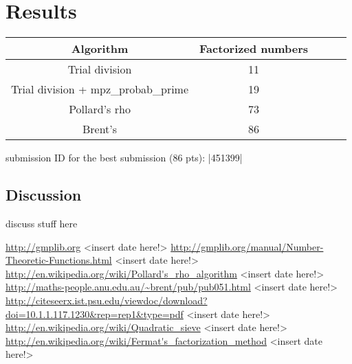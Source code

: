 \documentclass[paper=a4, fontsize=11pt,numbers=endperiod]{scrartcl} %
\numberwithin{equation}{section} %
\numberwithin{figure}{section} %
\numberwithin{table}{section} %
\begin{document}
\hspace{0pt}\\\\

\section{Results}


    \begin{tabular}{|c|c|c|c|c|}
    \hline
    \textbf{Algorithm} & \textbf{Factorized numbers} \\ \hline
    Trial division & 11 \\ \hline
    Trial division + mpz\_probab\_prime & 19 \\ \hline
    Pollard's rho & 73 \\ \hline
    Brent's & 86 \\ \hline
    \end{tabular}
    \hspace{10pt}

    submission ID for the best submission (86 pts): |451399|


\subsection{Discussion}

discuss stuff here

\begin{thebibliography}{9}

\url{http://gmplib.org} <insert date here!>
\url{http://gmplib.org/manual/Number-Theoretic-Functions.html} <insert date here!>
\url{http://en.wikipedia.org/wiki/Pollard's_rho_algorithm} <insert date here!>
\url{http://maths-people.anu.edu.au/~brent/pub/pub051.html} <insert date here!>
\url{http://citeseerx.ist.psu.edu/viewdoc/download?doi=10.1.1.117.1230&rep=rep1&type=pdf} <insert date here!>
\url{http://en.wikipedia.org/wiki/Quadratic_sieve} <insert date here!>
\url{http://en.wikipedia.org/wiki/Fermat's_factorization_method} <insert date here!>
\end{thebibliography}
\end{document}
